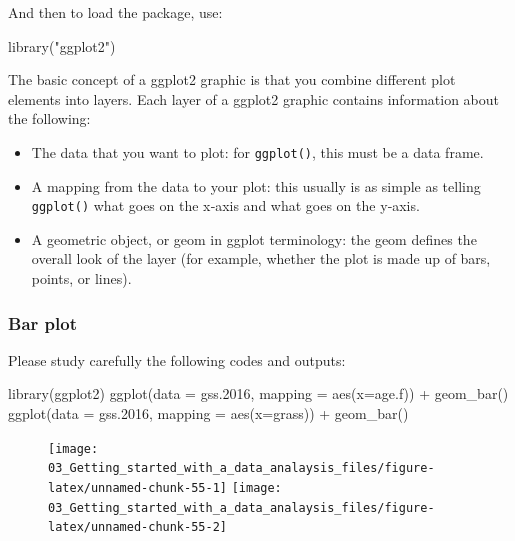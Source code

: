 \documentclass[
]{book}
\newenvironment{Shaded}{\begin{snugshade}}{\end{snugshade}}
\newcommand{\AttributeTok}[1]{\textcolor[rgb]{0.77,0.63,0.00}{#1}}
\newcommand{\FloatTok}[1]{\textcolor[rgb]{0.00,0.00,0.81}{#1}}
\newcommand{\FunctionTok}[1]{\textcolor[rgb]{0.00,0.00,0.00}{#1}}
\newcommand{\NormalTok}[1]{#1}
\newcommand{\SpecialCharTok}[1]{\textcolor[rgb]{0.00,0.00,0.00}{#1}}
\newcommand{\StringTok}[1]{\textcolor[rgb]{0.31,0.60,0.02}{#1}}
\providecommand{\tightlist}{%
  \setlength{\itemsep}{0pt}\setlength{\parskip}{0pt}}
\begin{document}
And then to load the package, use:

\begin{Shaded}
\begin{Highlighting}[]
\FunctionTok{library}\NormalTok{(}\StringTok{"ggplot2"}\NormalTok{)}
\end{Highlighting}
\end{Shaded}

The basic concept of a ggplot2 graphic is that you combine different plot elements into layers. Each layer of a ggplot2 graphic contains information about the following:

\begin{itemize}
\tightlist
\item
  The data that you want to plot: for \texttt{ggplot()}, this must be a data
  frame.
\item
  A mapping from the data to your plot: this usually is as simple as telling \texttt{ggplot()} what goes on the x‐axis and what goes on the y‐axis.
\item
  A geometric object, or geom in ggplot terminology: the geom defines
  the overall look of the layer (for example, whether the plot is made up of bars, points, or lines).
\end{itemize}

\hypertarget{bar-plot-1}{%
\subsubsection{Bar plot}\label{bar-plot-1}}

Please study carefully the following codes and outputs:

\begin{Shaded}
\begin{Highlighting}[]
\FunctionTok{library}\NormalTok{(ggplot2)}
\FunctionTok{ggplot}\NormalTok{(}\AttributeTok{data =}\NormalTok{ gss}\FloatTok{.2016}\NormalTok{, }\AttributeTok{mapping =} \FunctionTok{aes}\NormalTok{(}\AttributeTok{x=}\NormalTok{age.f)) }\SpecialCharTok{+} \FunctionTok{geom\_bar}\NormalTok{()}
\FunctionTok{ggplot}\NormalTok{(}\AttributeTok{data =}\NormalTok{ gss}\FloatTok{.2016}\NormalTok{, }\AttributeTok{mapping =} \FunctionTok{aes}\NormalTok{(}\AttributeTok{x=}\NormalTok{grass)) }\SpecialCharTok{+} \FunctionTok{geom\_bar}\NormalTok{()}
\end{Highlighting}
\end{Shaded}

\begin{figure}
\texttt{[image: 03\_Getting\_started\_with\_a\_data\_analaysis\_files/figure-latex/unnamed-chunk-55-1]} \texttt{[image: 03\_Getting\_started\_with\_a\_data\_analaysis\_files/figure-latex/unnamed-chunk-55-2]} \end{figure}
\end{document}
